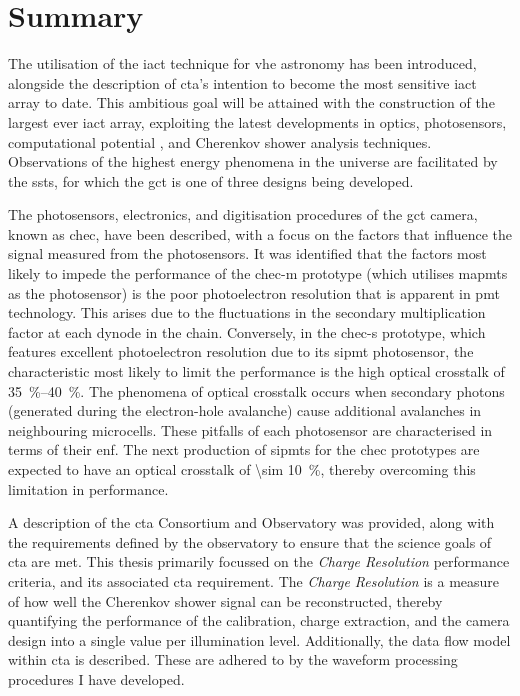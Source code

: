 \chapter{\label{ch9-summary}Summary} 

The utilisation of the \gls{iact} technique for \gls{vhe} astronomy has been introduced, alongside the description of \gls{cta}'s intention to become the most sensitive \gls{iact} array to date. This ambitious goal will be attained with the construction of the largest ever \gls{iact} array, exploiting the latest developments in optics, photosensors, computational potential , and Cherenkov shower analysis techniques. Observations of the highest energy phenomena in the universe are facilitated by the \glspl{sst}, for which the \gls{gct} is one of three designs being developed.

The photosensors, electronics, and digitisation procedures of the \gls{gct} camera, known as \gls{chec}, have been described, with a focus on the factors that influence the signal measured from the photosensors. It was identified that the factors most likely to impede the performance of the \gls{chec-m} prototype (which utilises \glspl{mapmt} as the photosensor) is the poor photoelectron resolution that is apparent in \gls{pmt} technology. This arises due to the fluctuations in the secondary multiplication factor at each dynode in the chain. Conversely, in the \gls{chec-s} prototype, which features excellent photoelectron resolution due to its \gls{sipmt} photosensor, the characteristic most likely to limit the performance is the high optical crosstalk of \SIrange{35}{40}{\percent}. The phenomena of optical crosstalk occurs when secondary photons (generated during the electron-hole avalanche) cause additional avalanches in neighbouring microcells. These pitfalls of each photosensor are characterised in terms of their \gls{enf}. The next production of \glspl{sipmt} for the \gls{chec} prototypes are expected to have an optical crosstalk of \SI{\sim 10}{\percent}, thereby overcoming this limitation in performance.

A description of the \gls{cta} Consortium and Observatory was provided, along with the requirements defined by the observatory to ensure that the science goals of \gls{cta} are met. This thesis primarily focussed on the \textit{Charge Resolution} performance criteria, and its associated \gls{cta} requirement. The \textit{Charge Resolution} is a measure of how well the Cherenkov shower signal can be reconstructed, thereby quantifying the performance of the calibration, charge extraction, and the camera design into a single value per illumination level. Additionally, the data flow model within \gls{cta} is described. These are adhered to by the waveform processing procedures I have developed.

